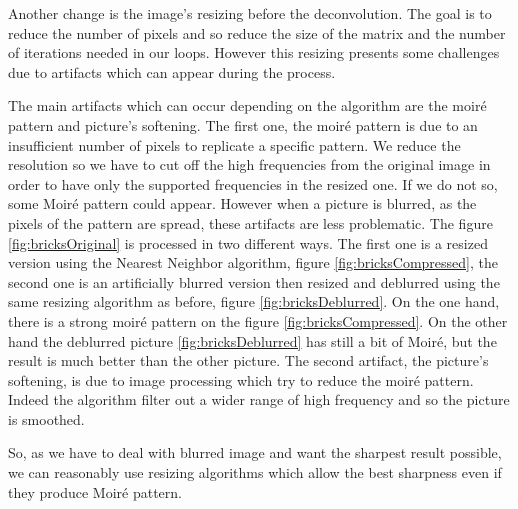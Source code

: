 Another change is the image's resizing before the deconvolution. The goal is to reduce the number of pixels and so reduce the size of the matrix and the number of iterations needed in our loops.  However this resizing presents some challenges due to artifacts which can appear during the process. 

The main artifacts which can occur depending on the algorithm are the moiré pattern and picture's softening.  
The first one, the moiré pattern is due to an insufficient number of pixels to replicate a specific pattern. We reduce the resolution so we have to cut off the high frequencies from the original image in order to have only the supported frequencies in the resized one. If we do not so, some Moiré pattern could appear.  However when a picture is blurred, as the pixels of the pattern are spread, these artifacts are less problematic. The figure \ref{fig:bricksOriginal} is processed in two different ways. The first one is a resized version using the Nearest Neighbor algorithm, figure \ref{fig:bricksCompressed}, the second one is an artificially blurred version then resized and deblurred using the same resizing algorithm as before, figure \ref{fig:bricksDeblurred}. On the one hand, there is a strong moiré pattern on the figure \ref{fig:bricksCompressed}. On the other hand the deblurred picture \ref{fig:bricksDeblurred} has still a bit of Moiré, but the result is much better than the other picture. 
The second artifact, the picture's softening, is due to image processing which try to reduce the moiré pattern. Indeed the algorithm filter out a wider range of high frequency and so the picture is smoothed.  

So, as we have to deal with blurred image and want the sharpest result possible, we can reasonably use resizing algorithms which allow the best sharpness even if they produce Moiré pattern. 

